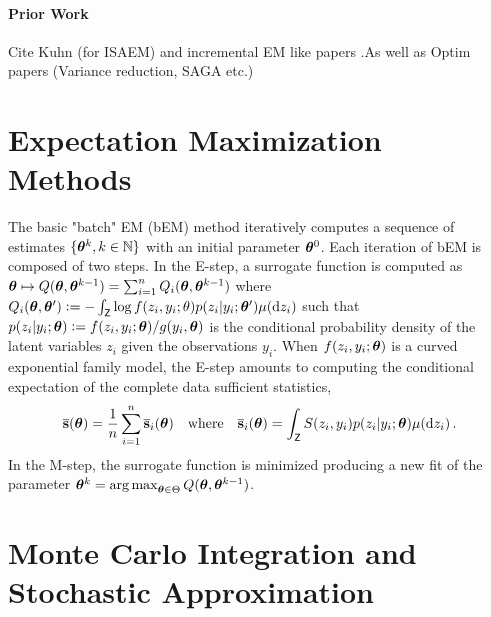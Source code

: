 \documentclass[11pt]{article}
\theoremstyle{t}
\begin{document}
\paragraph{Prior Work} 
Cite Kuhn (for ISAEM) and incremental EM like papers .As well as Optim papers (Variance reduction, SAGA etc.)

\section{Expectation Maximization Methods}
The basic "batch" EM (bEM) method iteratively computes a sequence of estimates $\{ {\bm{\theta}}^k, k \in \mathbb{N}\}$ with an initial parameter ${\bm{\theta}}^0$. Each iteration of bEM is composed of two steps. In the {\sf E-step}, a surrogate function is computed as ${\bm{\theta}} \mapsto Q({\bm{\theta}},{\bm{\theta}}^{k-1}) = \sum_{i=1}^n Q_i({\bm{\theta}},{\bm{\theta}}^{k-1})$ where $Q_i({\bm{\theta}},{\bm{\theta}}') \mathrel{\mathop:}= - \int_{\mathsf{Z}} \log f(z_i,y_i;\theta) p(z_i|y_i;{\bm{\theta}}') \mu(\mathrm d z_i)$ such that $p(z_i|y_i;{\bm{\theta}}) \mathrel{\mathop:}= f(z_i,y_i;{\bm{\theta}})/ g(y_i,{\bm{\theta}})$ is the conditional probability density of the latent variables $z_i$ given the observations $y_i$. When $f(z_i,y_i;{\bm{\theta}})$ is a curved exponential family model, the {\sf E-step} amounts to computing the conditional expectation of the complete data sufficient statistics, 
\begin{equation}
\label{eq:definition-overline-bss}
\overline{{\mathbf{s}}}({\bm{\theta}})= \frac{1}{n} \sum_{i=1}^n \overline{{\mathbf{s}}}_i({\bm{\theta}}) \quad  \text{where}  \quad \overline{{\mathbf{s}}}_i({\bm{\theta}})= \int_{\mathsf{Z}} S(z_i,y_i) p(z_i|y_i;{\bm{\theta}}) \mu(\mathrm d z_i) \,.
\end{equation}
In the {\sf M-step}, the surrogate function is minimized producing a new fit of the parameter ${\bm{\theta}}^{k} = \mathop{\mathrm{arg\,max}}_{{\bm{\theta}} \in \Theta} Q({\bm{\theta}},{\bm{\theta}}^{k-1})$.

\section{Monte Carlo Integration and Stochastic Approximation} \label{sec:sEM}
\end{document}
